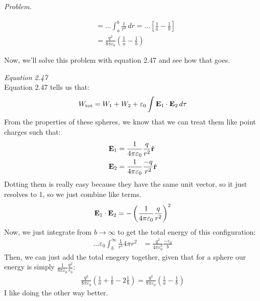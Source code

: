 \documentclass[10pt,oneside]{book}
\newcommand{\gspc}{\vspace{0.13cm}} %
\newcommand{\gline}[0]{\gspc\\} %
\newenvironment{problem}[1]
  {\vspace{-0.1cm}\begin{tcolorbox}[problembox]
   \textit{Problem. }#1}
  {\end{tcolorbox}\gspc}
\newenvironment{subproblem}[2]
  {\vspace{-0.1cm}\begin{tcolorbox}[subproblembox]
   \textit{#1 }#2}
  {\end{tcolorbox}\gspc}
\newcommand{\cpr}[1]{\left(#1\right)}
\newcommand{\arhat}{\hat{\mathbf{r}}}
\begin{document}
\begin{problem}
\begin{subproblem}{}
\begin{align*}
      &= \ldots \int_a^b \frac{1}{r^2}\,dr=\ldots\left[\frac{1}a-\frac{1}b\right]\\
      &=\frac{q^2}{8\pi\varepsilon_0}\cpr{\frac{1}a-\frac{1}b}
    \end{align*}
  \end{subproblem}
  Now, we'll solve this problem with equation 2.47 and see how that goes. 
  \begin{subproblem}{Equation 2.47}\gline{}
    Equation 2.47 tells us that:
    \begin{align*}
      W_\text{tot}=W_1+W_2 +\varepsilon_0\int{\mathbf{E}}_1\cdot{\mathbf{E}}_2\,d\tau
    \end{align*}
    From the properties of these spheres, we know that we can treat them like point charges such that:
    \begin{align*}
      \vE_1 &= \frac{1}{4\pi\varepsilon_0}\frac{q}{r^2}\arhat\\
      \vE_2&=\frac{1}{4\pi\varepsilon_0}\frac{-q}{r^2}\arhat
    \end{align*}
    Dotting them is really easy because they have the same unit vector, so it just resolves to 1, so we just combine like terms. 
    \begin{align*}
      \vE_1\cdot \vE_2 = -\cpr{\frac{1}{4\pi\varepsilon_0}\frac{q}{r^2}}^2
    \end{align*}
    Now, we just integrate from $b\to\infty$ to get the total energy of this configuration:
    \begin{align*}
      \ldots\varepsilon_0\int_b^\infty \frac{1}{r^4}4\pi r^2&=\frac{q^2}{4\pi\varepsilon_0^2}\frac{-\varepsilon_0}b
    \end{align*}
    Then, we can just add the total enegery together, given that for a sphere our energy is simply $\frac{1}{8\pi\varepsilon_0}\frac{q^2}{r_0}$:
    \begin{align*}
      \frac{q^2}{8\pi\varepsilon_0}\cpr{\frac{1}a+\frac{1}b-2\frac{1}b}=\frac{q^2}{8\pi\varepsilon_0}(\frac{1}a - \frac{1}b)
    \end{align*}
    I like doing the other way better. 
  \end{subproblem}
\end{problem}
\pagebreak
\end{document}
